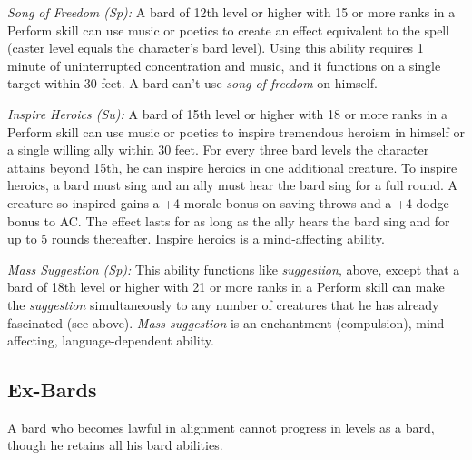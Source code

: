 \textit{Song of Freedom (Sp):} A bard of 12th level or higher with 15 or more ranks 
in a Perform skill can use music or poetics to create an effect equivalent to the 
 spell (caster level equals the character's bard level). 
Using this ability requires 1 minute of uninterrupted concentration and music, 
and it functions on a single target within 30 feet. A bard can't use \textit{song 
of freedom} on himself.

\textit{Inspire Heroics (Su):} A bard of 15th level or higher with 18 or more ranks 
in a Perform skill can use music or poetics to inspire tremendous heroism in himself 
or a single willing ally within 30 feet. For every three bard levels the character 
attains beyond 15th, he can inspire heroics in one additional creature. To inspire 
heroics, a bard must sing and an ally must hear the bard sing for a full round. 
A creature so inspired gains a +4 morale bonus on saving throws and a +4 dodge 
bonus to AC. The effect lasts for as long as the ally hears the bard sing and for 
up to 5 rounds thereafter. Inspire heroics is a mind-affecting ability.

\textit{Mass Suggestion (Sp):} This ability functions like \textit{suggestion}, 
above, except that a bard of 18th level or higher with 21 or more ranks in a Perform 
skill can make the \textit{suggestion} simultaneously to any number of creatures 
that he has already fascinated (see above). \textit{Mass suggestion} is an enchantment 
(compulsion), mind-affecting, language-dependent ability.

\subsection{Ex-Bards}

A bard who becomes lawful in alignment cannot progress in levels as a bard, though 
he retains all his bard abilities.